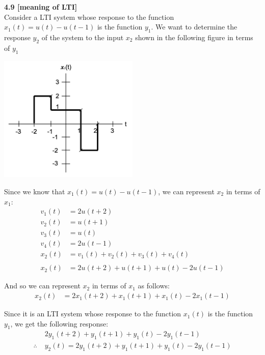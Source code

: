 \documentclass{article}
\begin{document}
\bigskip
{\bf 4.9 [meaning of LTI]}\\
Consider a LTI system whose response to the function $x_1(t) = u(t) - u(t - 1)$ is the function $y_1$. We want to determine the response $y_2$ of the system to the input $x_2$ shown in the following figure in terms of $y_1$
\begin{center}
    \includegraphics[width=0.5\textwidth]{49.png}
\end{center}

Since we know that $x_1(t) = u(t) - u(t - 1)$, we can represent $x_2$ in terms of $x_1$:
\begin{equation*}
\begin{split}
    v_1(t) &= 2u(t + 2)\\
    v_2(t) &= u(t + 1)\\
    v_3(t) &= u(t)\\
    v_4(t) &= 2u(t - 1)\\
    x_2(t) &= v_1(t) + v_2(t) + v_3(t) + v_4(t)\\\\
    x_2(t) &= 2u(t + 2) + u(t + 1) + u(t) - 2u(t - 1)
\end{split}
\end{equation*}

And so we can represent $x_2$ in terms of $x_1$ as follows:
\begin{equation*}
\begin{split}
    x_2(t) &= 2x_1(t + 2) + x_1(t + 1) + x_1(t) - 2x_1(t - 1)
\end{split}
\end{equation*}

Since it is an LTI system whose response to the function $x_1(t)$ is the function $y_1$, we get the following response:
\begin{equation*}
\begin{split}
    & 2y_1(t + 2) + y_1(t + 1) + y_1(t) - 2y_1(t - 1)\\
    \therefore \; & y_2(t) = 2y_1(t + 2) + y_1(t + 1) + y_1(t) - 2y_1(t - 1)
\end{split}
\end{equation*}
\end{document}
